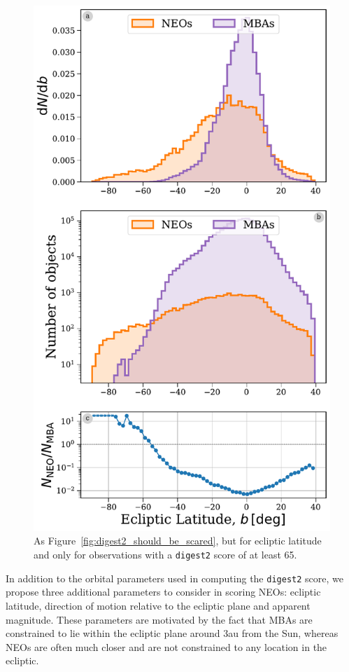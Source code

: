 \documentclass[twocolumn, twocolappendix]{aastex631}
\newcommand{\dig}{\texttt{digest2}}
\begin{document}
\begin{figure}[htb]
    \centering
    \includegraphics[width=\columnwidth]{figures/ecliptic_latitude_dist_highscore.pdf}
    \caption{As Figure~\ref{fig:digest2_should_be_scared}, but for ecliptic latitude and only for observations with a \dig{} score of at least 65.}
    \label{fig:ecl_lat_highscore}
\end{figure}

In addition to the orbital parameters used in computing the \dig{} score, we propose three additional parameters to consider in scoring NEOs: ecliptic latitude, direction of motion relative to the ecliptic plane and apparent magnitude. These parameters are motivated by the fact that MBAs are constrained to lie within the ecliptic plane around 3au from the Sun, whereas NEOs are often much closer and are not constrained to any location in the ecliptic.
\end{document}

